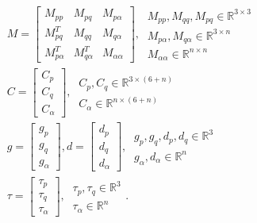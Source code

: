\documentclass[letterpaper, 10 pt, conference]{ieeeconf}  %
\begin{document}
\begin{subequations}\label{split_2}
\begin{align}
&M = \begin{bmatrix}
    M_{pp} & M_{pq} & M_{p\alpha} \\
    M_{pq}^T & M_{qq} & M_{q\alpha} \\
    M_{p\alpha}^T & M_{q\alpha}^T & M_{\alpha \alpha}
    \end{bmatrix},~\begin{matrix}
M_{pp}, M_{qq}, M_{pq} \in \mathbb{R}^{3\times3}\\ 
M_{p\alpha},M_{q\alpha} \in \mathbb{R}^{3 \times n}\\ 
M_{\alpha \alpha} \in \mathbb{R}^{n \times n}
\end{matrix}\\
&C = \begin{bmatrix}
    C_p \\
    C_q \\
    C_\alpha
    \end{bmatrix}, ~\begin{matrix} C_p , C_q \in \mathbb{R}^{3 \times (6+n)} \\C_\alpha \in \mathbb{R}^{n \times (6+n)}  \end{matrix}\\
&g = \begin{bmatrix}
    g_p \\
    g_q \\
    g_\alpha
    \end{bmatrix},
    d = \begin{bmatrix}
    d_p \\
    d_q \\
    d_\alpha
    \end{bmatrix}, ~\begin{matrix} g_p, g_q,d_p,d_q \in \mathbb{R}^{3}\\ g_\alpha, d_\alpha \in \mathbb{R}^{n}\end{matrix}\\
& \tau = \begin{bmatrix}
    \tau_p \\
    \tau_q \\
    \tau_\alpha
    \end{bmatrix}, ~\begin{matrix} \tau_p, \tau_q \in \mathbb{R}^{3}\\ \tau_\alpha \in \mathbb{R}^{n}\end{matrix}.\\

\end{align}
\end{subequations}
\end{document}
